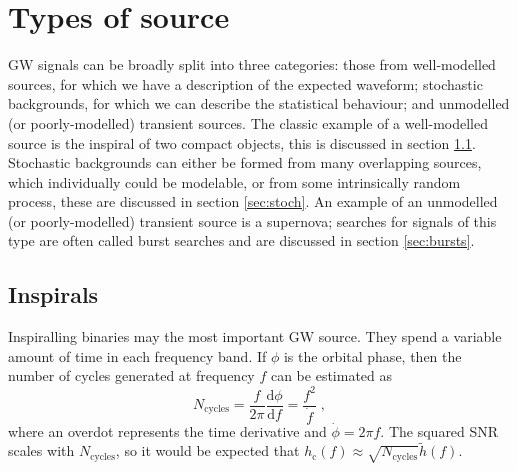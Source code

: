 \section{Types of source}\label{sec:voc}

GW signals can be broadly split into three categories: those from well-modelled sources, for which we have a description of the expected waveform; stochastic backgrounds, for which we can describe the statistical behaviour; and unmodelled (or poorly-modelled) transient sources. The classic example of a well-modelled source is the inspiral of two compact objects, this is discussed in section \ref{sec:insp}. Stochastic backgrounds can either be formed from many overlapping sources, which individually could be modelable, or from some intrinsically random process, these are discussed in section \ref{sec:stoch}. An example of an unmodelled (or poorly-modelled) transient source is a supernova; searches for signals of this type are often called burst searches and are discussed in section \ref{sec:bursts}.

\subsection{Inspirals}\label{sec:insp}

Inspiralling binaries may the most important GW source. They spend a variable amount of time in each frequency band. If $\phi$ is the orbital phase, then the number of cycles generated at frequency $f$ can be estimated as
\begin{equation}\label{eq:inspiral}
{N}_{\mathrm{cycles}} = \frac{f}{2\pi} \frac{\mathrm{d}\phi}{\mathrm{d}f} = \frac{f^{2}}{\dot{f}} \; ,
\end{equation}
where an overdot represents the time derivative and $\dot{\phi} = 2\pi f$. The squared SNR scales with ${N}_{\mathrm{cycles}}$, so it would be expected that $h_\mathrm{c}(f)\approx \sqrt{{N}_{\mathrm{cycles}}}\tilde{h}(f)$.

